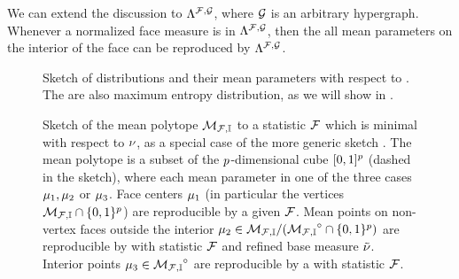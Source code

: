 We can extend the discussion to $\Lambda^{\mathcal{F},\mathcal{G}}$, where $\mathcal{G}$ is an arbitrary hypergraph.
Whenever a normalized face measure is in $\Lambda^{\mathcal{F},\mathcal{G}}$, then the all mean parameters on the interior of the face can be reproduced by $\Lambda^{\mathcal{F},\mathcal{G}}$.

%




\begin{figure}[t]
    \begin{center}
        
    \end{center}
    \caption{Sketch of distributions and their mean parameters with respect to .
    The \HybridLogicNetworks{} are also maximum entropy distribution, as we will show in .}
    \label{fig:reproducibleSketch}
\end{figure}

\begin{figure}[t]
    \begin{center}
        
    \end{center}
    \caption{Sketch of the mean polytope ${\mathcal{M}_{\mathcal{F},\mathbb{I}}}$ to a statistic $\mathcal{F}$ which is minimal with respect to $\nu$, as a special case of the more generic sketch .
    The mean polytope is a subset of the $p$-dimensional cube $[0,1]^{p}$ (dashed in the sketch), where each mean parameter in one of the three cases $\mu_{1},\mu_{2}$ or $\mu_{3}$.
    \textcolor{\concolor}{Face centers} $\mu_{1}$ (in particular the vertices $\mathcal{M}_{\mathcal{F},\mathbb{I}}\cap\{0,1\}^{p}$) are reproducible by a \HardLogicNetwork{} given $\mathcal{F}$.
    Mean points on non-vertex faces outside the interior $\mu_{2}\in\mathcal{M}_{\mathcal{F},\mathbb{I}}/({\mathcal{M}_{\mathcal{F},\mathbb{I}}}^{\circ}\cap\{0,1\}^{p})$ are reproducible by \HybridLogicNetworks{} with statistic $\mathcal{F}$ and refined base measure $\tilde{\nu}$.
    \textcolor{\probcolor}{Interior points} $\mu_{3}\in{\mathcal{M}_{\mathcal{F},\mathbb{I}}}^{\circ}$ are reproducible by a \MarkovLogicNetwork{} with statistic $\mathcal{F}$.
    }\label{fig:meansetSketch}
\end{figure}

